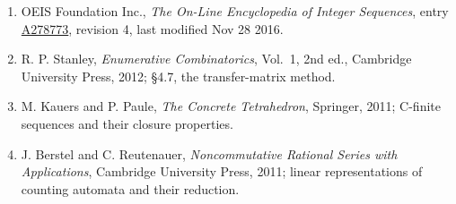 \documentclass[11pt]{article}
\theoremstyle{definition}
\begin{document}
\begin{enumerate}

\item OEIS Foundation Inc., \emph{The On-Line Encyclopedia of Integer Sequences}, entry \href{https://oeis.org/A278773}{A278773}, revision 4, last modified Nov 28 2016.

\item R. P. Stanley, \emph{Enumerative Combinatorics}, Vol.~1, 2nd ed., Cambridge University Press, 2012; \S4.7, the transfer-matrix method.

\item M. Kauers and P. Paule, \emph{The Concrete Tetrahedron}, Springer, 2011; C-finite sequences and their closure properties.

\item J. Berstel and C. Reutenauer, \emph{Noncommutative Rational Series with Applications}, Cambridge University Press, 2011; linear representations of counting automata and their reduction.

\end{enumerate}
\end{document}

